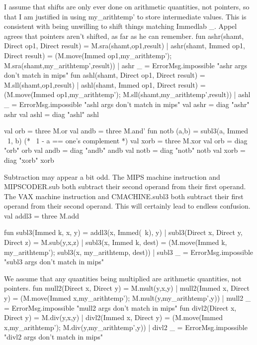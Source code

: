 \endcode
{}
I assume that shifts are only ever done on arithmetic quantities,
not pointers, so that I am justified in using \code{}my_arithtemp'\edoc{} to
store intermediate values.  This is consistent with being unwilling
to shift things matching \code{}Immedlab _\edoc{}.
Appel agrees that pointers aren't shifted, as far as he can remember.
\enddocs
{}
\endmoddef
fun ashr(shamt, Direct op1, Direct result) = M.sra(shamt,op1,result)
  | ashr(shamt, Immed op1, Direct result) = 
        (M.move(Immed op1,my_arithtemp'); M.sra(shamt,my_arithtemp',result))
  | ashr _ = ErrorMsg.impossible "ashr args don't match in mips"
fun ashl(shamt, Direct op1, Direct result) = M.sll(shamt,op1,result)
  | ashl(shamt, Immed op1, Direct result) = 
        (M.move(Immed op1,my_arithtemp'); M.sll(shamt,my_arithtemp',result))
  | ashl _ = ErrorMsg.impossible "ashl args don't match in mips"
\endcode
{}
\endmoddef
val ashr = diag "ashr" ashr
val ashl = diag "ashl" ashl

\endcode
{}
\endmoddef
val orb = three M.or
val andb = three M.and'
fun notb (a,b) = subl3(a, Immed ~1, b) (* ~1 - a == one's complement *)
val xorb = three M.xor
\endcode
{}
\endmoddef
val orb = diag "orb" orb
val andb = diag "andb" andb
val notb = diag "notb" notb
val xorb = diag "xorb" xorb


\endcode
{}
Subtraction may appear a bit odd.
The MIPS machine instruction and  \code{}MIPSCODER.sub\edoc{} both subtract
their second operand from their first operand.
The VAX machine instruction and \code{}CMACHINE.subl3\edoc{} both subtract
their first operand from their second operand.
This will certainly lead to endless confusion.
\enddocs
{}
\endmoddef
val addl3 = three M.add

fun subl3(Immed k, x, y) = addl3(x, Immed(~k), y)
  | subl3(Direct x, Direct y, Direct z) = M.sub(y,x,z)
  | subl3(x, Immed k, dest) = 
            (M.move(Immed k, my_arithtemp');
             subl3(x, my_arithtemp, dest))
  | subl3 _ = ErrorMsg.impossible "subl3 args don't match in mips"

\endcode
{}
We assume that any quantities being multiplied are arithmetic
quantities, not pointers.
\enddocs
{}
\endmoddef
fun mull2(Direct x, Direct y) = M.mult(y,x,y)
  | mull2(Immed x, Direct y) = (M.move(Immed x,my_arithtemp');
                                M.mult(y,my_arithtemp',y))
  | mull2 _ = ErrorMsg.impossible "mull2 args don't match in mips"
fun divl2(Direct x, Direct y) = M.div(y,x,y)
  | divl2(Immed x, Direct y) = (M.move(Immed x,my_arithtemp');
                                M.div(y,my_arithtemp',y))
  | divl2 _ = ErrorMsg.impossible "divl2 args don't match in mips"

